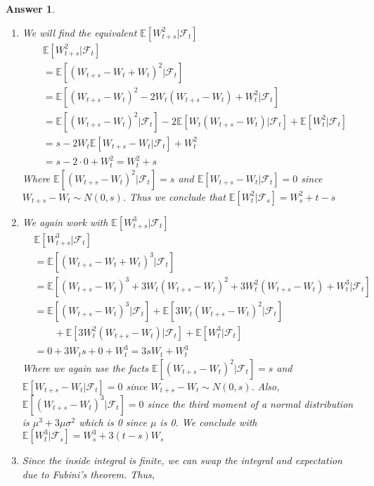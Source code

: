 \documentclass[12pt]{article}
\theoremstyle{colon}
\newtheorem*{answer}{Answer}
\begin{document}
\begin{answer}
  \leavevmode
  \begin{enumerate}[label=\alph*)]
    \item We will find the equivalent $\mathbb{E}[W_{t+s}^2 | \mathcal{F}_t]$
      \begin{align*}
        &\mathbb{E}[W_{t+s}^2 | \mathcal{F}_t] \\
        &= \mathbb{E}[(W_{t+s}-W_t+W_t)^2 | \mathcal{F}_t] \\
        &= \mathbb{E}[(W_{t+s}-W_t)^2 -2W_t(W_{t+s}-W_t) +W_t^2 | \mathcal{F}_t] \\
        &= \mathbb{E}[(W_{t+s}-W_t)^2 | \mathcal{F}_t] -2\mathbb{E}[W_t(W_{t+s}-W_t)| \mathcal{F}_t] +\mathbb{E}[W_t^2| \mathcal{F}_t] \\
        &= s - 2W_t \mathbb{E}[W_{t+s}-W_t| \mathcal{F}_t] + W_t^2 \\
        &= s - 2 \cdot 0 + W_t^2 = W_t^2 + s
      \end{align*}
      Where $\mathbb{E}[(W_{t+s}-W_t)^2 | \mathcal{F}_t] = s$ and $\mathbb{E}[W_{t+s}-W_t| \mathcal{F}_t] = 0$ since $W_{t+s} - W_t \sim N(0,s)$. Thus we conclude that $\mathbb{E}[W_t^2 | \mathcal{F}_s] = W_s^2 + t - s$
    \item We again work with $\mathbb{E}[W_{t+s}^3 | \mathcal{F}_t]$
      \begin{align*}
        &\mathbb{E}[W_{t+s}^3 | \mathcal{F}_t] \\
        &= \mathbb{E}[(W_{t+s}-W_t+W_t)^3 | \mathcal{F}_t] \\
        &= \mathbb{E}[(W_{t+s}-W_t)^3 +3W_t(W_{t+s}-W_t)^2 + 3W_t^2(W_{t+s}-W_t) +W_t^3 | \mathcal{F}_t] \\
        &= \mathbb{E}[(W_{t+s}-W_t)^3 | \mathcal{F}_t] + \mathbb{E}[3W_t(W_{t+s}-W_t)^2 | \mathcal{F}_t] \\
        & \qquad + \mathbb{E}[3W_t^2(W_{t+s}-W_t) | \mathcal{F}_t] + \mathbb{E}[W_t^3 | \mathcal{F}_t] \\
        &= 0 + 3 W_t s + 0 + W_t^3 = 3 s W_t + W_t^3
      \end{align*}
      Where we again use the facts $\mathbb{E}[(W_{t+s}-W_t)^2 | \mathcal{F}_t] = s$ and $\mathbb{E}[W_{t+s}-W_t| \mathcal{F}_t] = 0$ since $W_{t+s} - W_t \sim N(0,s)$. Also, $\mathbb{E}[(W_{t+s}-W_t)^3| \mathcal{F}_t] = 0$ since the third moment of a normal distribution is $\mu^3 + 3 \mu \sigma^2$ which is 0 since $\mu$ is 0. We conclude with $\mathbb{E}[W_t^3 | \mathcal{F}_s] = W_s^3 + 3(t - s)W_s$
    \item Since the inside integral is finite, we can swap the integral and expectation due to Fubini's theorem. Thus,

\end{enumerate}
\end{answer}
\end{document}
